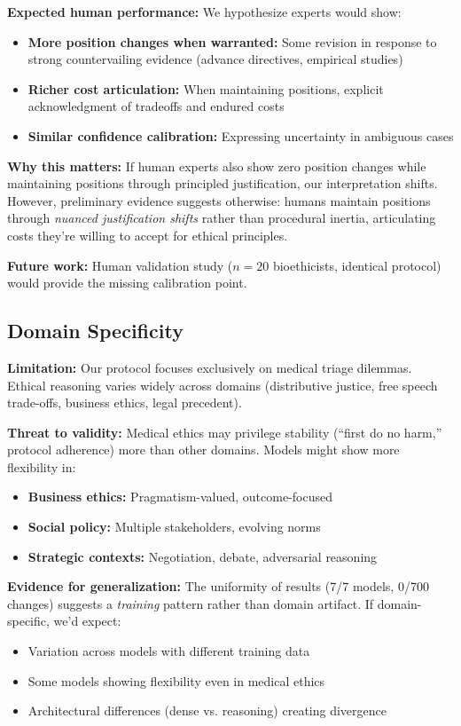 \documentclass[11pt]{article}
\begin{document}
\textbf{Expected human performance:} We hypothesize experts would show:
\begin{itemize}
\item \textbf{More position changes when warranted:} Some revision in response to strong countervailing evidence (advance directives, empirical studies)
\item \textbf{Richer cost articulation:} When maintaining positions, explicit acknowledgment of tradeoffs and endured costs
\item \textbf{Similar confidence calibration:} Expressing uncertainty in ambiguous cases
\end{itemize}

\textbf{Why this matters:} If human experts also show zero position changes while maintaining positions through principled justification, our interpretation shifts. However, preliminary evidence suggests otherwise: humans maintain positions through \textit{nuanced justification shifts} rather than procedural inertia, articulating costs they're willing to accept for ethical principles.

\textbf{Future work:} Human validation study ($n=20$ bioethicists, identical protocol) would provide the missing calibration point.

\subsection{Domain Specificity}

\textbf{Limitation:} Our protocol focuses exclusively on medical triage dilemmas. Ethical reasoning varies widely across domains (distributive justice, free speech trade-offs, business ethics, legal precedent).

\textbf{Threat to validity:} Medical ethics may privilege stability (``first do no harm,'' protocol adherence) more than other domains. Models might show more flexibility in:
\begin{itemize}
\item \textbf{Business ethics:} Pragmatism-valued, outcome-focused
\item \textbf{Social policy:} Multiple stakeholders, evolving norms
\item \textbf{Strategic contexts:} Negotiation, debate, adversarial reasoning
\end{itemize}

\textbf{Evidence for generalization:} The uniformity of results (7/7 models, 0/700 changes) suggests a \textit{training} pattern rather than domain artifact. If domain-specific, we'd expect:
\begin{itemize}
\item Variation across models with different training data
\item Some models showing flexibility even in medical ethics
\item Architectural differences (dense vs. reasoning) creating divergence
\end{itemize}
\end{document}
